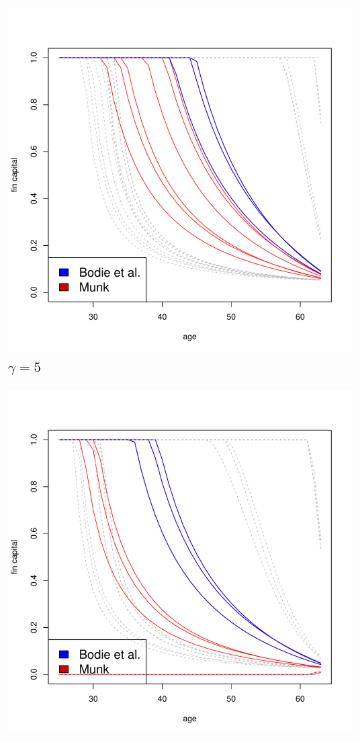 \documentclass[]{elsarticle}
\begin{document}
\begin{figure}[H]\ContinuedFloat
    \begin{subfigure}{0.45\textwidth}
		\centering
		\includegraphics[scale=0.3]{figs/individuals5.pdf}
		\caption{$\gamma = 5$}
	\end{subfigure}
	\hfill
    \begin{subfigure}{0.45\textwidth}
		\centering
		\includegraphics[scale=0.3]{figs/individuals10.pdf}

\end{subfigure}
\end{figure}
\end{document}

